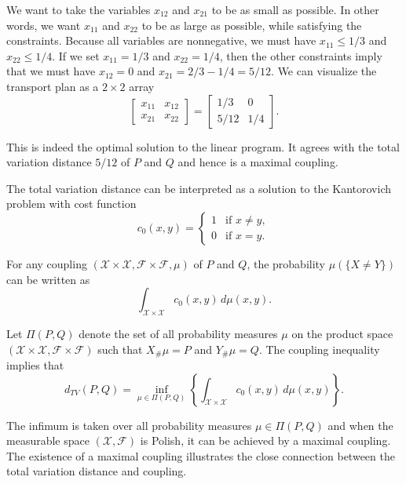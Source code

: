 We want to take the variables $x_{12}$ and $x_{21}$ to be as small as possible. In other words, we want $x_{11}$ and $x_{22}$ to be as large as possible, while satisfying the constraints. Because all variables are nonnegative, we must have $x_{11}\le 1/3$ and $x_{22}\le 1/4$. If we set $x_{11}=1/3$ and $x_{22}=1/4$, then the other constraints imply that we must have $x_{12}=0$ and $x_{21}=2/3-1/4=5/12$. We can visualize the transport plan as a $2\times 2$ array
\[
\begin{bmatrix}
x_{11} & x_{12}\\
x_{21} & x_{22}
\end{bmatrix}
=
\begin{bmatrix}
1/3 & 0\\
5/12 & 1/4
\end{bmatrix}.
\]

This is indeed the optimal solution to the linear program. It agrees with the total variation distance $5/12$ of $P$ and $Q$ and hence is a maximal coupling.

The total variation distance can be interpreted as a solution to the Kantorovich problem with cost function
\[
c_0(x,y)=
\begin{cases}
1 & \text{if } x\neq y,\\
0 & \text{if } x=y.
\end{cases}
\]

For any coupling $(\mathcal{X}\times \mathcal{X},\mathcal{F}\times \mathcal{F},\mu)$ of $P$ and $Q$, the probability $\mu(\{X\neq Y\})$ can be written as
\[
\int_{\mathcal{X}\times \mathcal{X}} c_0(x,y)\, d\mu(x,y).
\]

Let $\Pi(P,Q)$ denote the set of all probability measures $\mu$ on the product space $(\mathcal{X}\times \mathcal{X},\mathcal{F}\times \mathcal{F})$ such that $X_{\#}\mu=P$ and $Y_{\#}\mu=Q$. The coupling inequality implies that
\begin{equation}
d_{TV}(P,Q)
=
\inf_{\mu\in \Pi(P,Q)}
\left\{
\int_{\mathcal{X}\times \mathcal{X}} c_0(x,y)\, d\mu(x,y)
\right\}.
\tag{8.4}
\end{equation}

The infimum is taken over all probability measures $\mu\in \Pi(P,Q)$ and when the measurable space $(\mathcal{X},\mathcal{F})$ is Polish, it can be achieved by a maximal coupling. The existence of a maximal coupling illustrates the close connection between the total variation distance and coupling.
